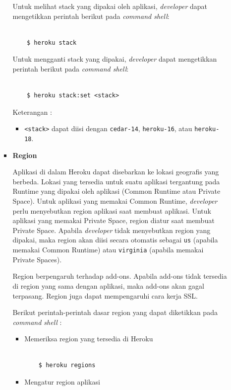 \documentclass[a4paper,twoside]{article}
\begin{document}
\begin{enumerate}
\begin{enumerate}
\begin{itemize}
Untuk melihat stack yang dipakai oleh aplikasi, \textit{developer} dapat mengetikkan perintah berikut pada \textit{command shell}:
\begin{lstlisting}

	$ heroku stack

\end{lstlisting}

Untuk mengganti stack yang dipakai, \textit{developer} dapat mengetikkan perintah berikut pada \textit{command shell}:
\begin{lstlisting}

	$ heroku stack:set <stack>

\end{lstlisting}
Keterangan :
\begin{itemize}
\item \texttt{<stack>} dapat diisi dengan \texttt{cedar-14}, \texttt{heroku-16}, atau \texttt{heroku-18}.
\end{itemize}
		
				\item \textbf{Region}
		
				Aplikasi di dalam Heroku dapat disebarkan ke lokasi geografis yang berbeda. Lokasi yang tersedia untuk suatu aplikasi tergantung pada Runtime yang dipakai oleh aplikasi (Common Runtime atau Private Space). Untuk aplikasi yang memakai Common Runtime, \textit{developer} perlu menyebutkan region aplikasi saat membuat aplikasi. Untuk aplikasi yang memakai Private Space, region diatur saat membuat Private Space. Apabila \textit{developer} tidak menyebutkan region yang dipakai, maka region akan diisi secara otomatis sebagai \texttt{us} (apabila memakai Common Runtime) atau \texttt{virginia} (apabila memakai Private Spaces).

Region berpengaruh terhadap add-ons. Apabila add-ons tidak tersedia di region yang sama dengan aplikasi, maka add-ons akan gagal terpasang. Region juga dapat mempengaruhi cara kerja SSL.

Berikut perintah-perintah dasar region yang dapat diketikkan pada \textit{command shell} :
\begin{itemize}
\item Memeriksa region yang tersedia di Heroku

\begin{lstlisting}

	$ heroku regions

\end{lstlisting}

\item Mengatur region aplikasi


\end{itemize}
\end{itemize}
\end{enumerate}
\end{enumerate}
\end{document}
